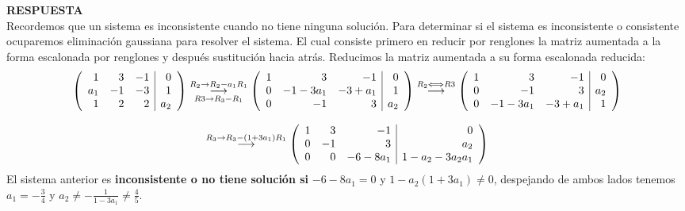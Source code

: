 \documentclass[11pt,letterpaper]{article}
\newcommand{\res}{\textbf{RESPUESTA}\\}
\newcommand{\grstep}[2][\relax]{%
   \ensuremath{\mathrel{
       {\mathop{\longrightarrow}\limits^{#2\mathstrut}_{
                                     \begin{subarray}{l} #1 \end{subarray}}}}}}
\begin{document}
\begin{enumerate}
\res Recordemos que un sistema es inconsistente cuando no tiene ninguna solución. Para determinar si el sistema es inconsistente o consistente ocuparemos eliminación gaussiana para resolver el sistema. El cual consiste primero en reducir por renglones la matriz aumentada a la forma escalonada por renglones y después sustitución hacia atrás. Reducimos la matriz aumentada a su forma escalonada reducida: 
\begin{equation*}
\begin{array}{c}
\left( \begin{array}{rrr|r}
1 & 3 & -1 & 0\\
a_1 & -1 & -3 & 1 \\
1 & 2 & 2 & a_2
\end{array} \right) %
\grstep[R3 \rightarrow R_3 -R_1]{R_2 \rightarrow R_2 -a_1R_1}
%
\left( \begin{array}{rrr|r}
1 & 3 & -1 & 0\\
0 & -1-3a_1 & -3+a_1 & 1 \\
0 & -1 & 3 & a_2
\end{array} \right) %
\grstep[]{R_2 \Longleftrightarrow R3}
%
\left( \begin{array}{rrr|r}
1 & 3 & -1 & 0\\
0 & -1 & 3 & a_2\\
0 & -1-3a_1 & -3+a_1 & 1 \\
\end{array} \right)\\
\\
%
\grstep[]{R_3 \rightarrow R_3-(1+3a_1)R_1}
%
\left( \begin{array}{rrr|r}
1 &  3 & -1 & 0\\
0 & -1 & 3 & a_2\\
0 &  0 & -6-8a_1 &  1-a_2-3a_2a_1\\
\end{array} \right)
\end{array}
\end{equation*}
El sistema anterior es \textbf{inconsistente o no tiene solución si} $-6-8a_1=0$ y $1-a_2(1+3a_1)\neq 0$, despejando de ambos lados tenemos $a_1=-\frac{3}{4}$ y $ a_2\neq -\frac{1}{1-3a_1}\neq\frac{4}{5}$.\\


\end{enumerate}
\end{document}
